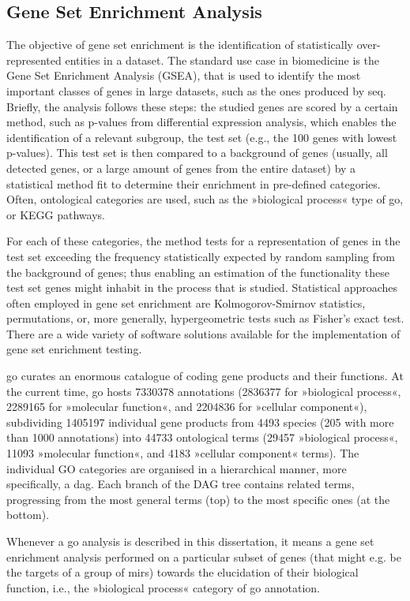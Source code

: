 \begin{method}
\subsection{Gene Set Enrichment Analysis} \label{sec:database:gsea}
The objective of gene set enrichment is the identification of statistically over-represented entities in a dataset. The standard use case in biomedicine is the Gene Set Enrichment Analysis (GSEA), that is used to identify the most important classes of genes in large datasets, such as the ones produced by \ac{seq}. Briefly, the analysis follows these steps: the studied genes are scored by a certain method, such as p-values from differential expression analysis, which enables the identification of a relevant subgroup, the test set (e.g., the 100 genes with lowest p-values). This test set is then compared to a background of genes (usually, all detected genes, or a large amount of genes from the entire dataset) by a statistical method fit to determine their enrichment in pre-defined categories. Often, ontological categories are used, such as the »biological process« type of \ac{go}, or KEGG pathways.

For each of these categories, the method tests for a representation of genes in the test set exceeding the frequency statistically expected by random sampling from the background of genes; thus enabling an estimation of the functionality these test set genes might inhabit in the process that is studied. Statistical approaches often employed in gene set enrichment are Kolmogorov-Smirnov statistics, permutations, or, more generally, hypergeometric tests such as Fisher's exact test. There are a wide variety of software solutions available for the implementation of gene set enrichment testing.

\acl{go} curates an enormous catalogue of coding gene products and their functions. At the current time, \ac{go} hosts \num{7330378} annotations (\num{2836377} for »biological process«, \num{2289165} for »molecular function«, and \num{2204836} for »cellular component«), subdividing \num{1405197} individual gene products from \num{4493} species (\num{205} with more than \num{1000} annotations) into \num{44733} ontological terms (\num{29457} »biological process«, \num{11093} »molecular function«, and \num{4183} »cellular component« terms). The individual GO categories are organised in a hierarchical manner, more specifically, a \ac{dag}. Each branch of the DAG tree contains related terms, progressing from the most general terms (top) to the most specific ones (at the bottom). 

Whenever a \ac{go} analysis is described in this dissertation, it means a gene set enrichment analysis performed on a particular subset of genes (that might e.g. be the targets of a group of \acp{mir}) towards the elucidation of their biological function, i.e., the »biological process« category of \ac{go} annotation.

\end{method}